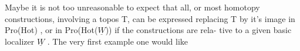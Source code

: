 Maybe it is not too unreasonable to expect that all, or most homotopy
constructions, involving a topos T, can be expressed  replacing T by
it's image in Pro(Hot) , or in Pro(Hot($\underline{W}$)) if the constructions are rela-%
tive to a given basic localizer $\underline{W}$ . The very first example one would like

